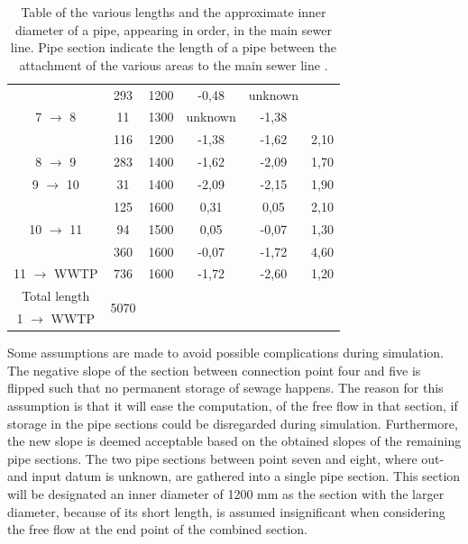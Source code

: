\begin{table} [H]
\begin{tabular}{|c|c|c|c|c|c|}
 										 & 293			  & 1200   & -0,48  & unknown&  \\
7 $\rightarrow$ 8						 & 11 			  & 1300   & unknown& -1,38&  \\
			 							 & 116			  & 1200   & -1,38  & -1,62&  2,10\\ \hline
8 $\rightarrow$ 9						 & 283			  & 1400   & -1,62  & -2,09&  1,70\\ \hline
9 $\rightarrow$ 10						 & 31			  & 1400   & -2,09  & -2,15& 1,90 \\ \hline
										 & 125			  & 1600   & 0,31   & 0,05 & 2,10 \\
10 $\rightarrow$ 11	 	 				 & 94			  & 1500   & 0,05   & -0,07& 1,30\\
						 			 	 & 360 			  & 1600   & -0,07  & -1,72& 4,60 \\ \hline
11 $\rightarrow$ WWTP   				 & 736			  & 1600   & -1,72  & -2,60& 1,20\\ \hline
Total length 		    				 & \multirow{2}{*}{5070}  &	  & & & 	 \\ 
1 $\rightarrow$ WWTP    				 &						  &   & & & \\ \hline

\end{tabular}

\caption{Table of the various lengths and the approximate inner diameter of a pipe, appearing in order, in the main sewer line. Pipe section indicate the length of a pipe between the attachment of the various areas to the main sewer line \cite{GIS_kort}.} 
\label{tab:kloak_diameter}
\end{table}

Some assumptions are made to avoid possible complications during simulation. The negative slope of the section between connection point four and five is flipped such that no permanent storage of sewage happens. The reason for this assumption is that it will ease the computation, of the free flow in that section, if storage in the pipe sections could be disregarded during simulation. Furthermore, the new slope is deemed acceptable based on the obtained slopes of the remaining pipe sections. 
The two pipe sections between point seven and eight, where out- and input datum is unknown, are gathered into a single pipe section. This section will be designated an inner diameter of 1200 mm as the section with the larger diameter, because of its short length, is assumed insignificant when considering the free flow at the end point of the combined section.

